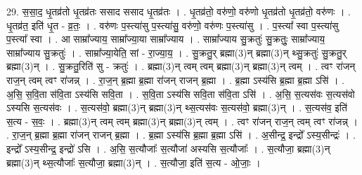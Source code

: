 \documentclass[17pt]{extarticle}
\begin{document}
29. स॒सा॒द॒ धृ॒तव्र॑तो धृ॒तव्र॑तः ससाद ससाद धृ॒तव्र॑तः । . धृ॒तव्र॑तो॒ वरु॑णो॒ वरु॑णो धृ॒तव्र॑तो धृ॒तव्र॑तो॒ वरु॑णः । . धृ॒तव्र॑त॒ इति॑ धृ॒त - व्र॒तः॒ । . वरु॑णः प॒स्त्या॑सु प॒स्त्या॑सु॒ वरु॑णो॒ वरु॑णः प॒स्त्या॑सु । . प॒स्त्या᳚ स्वा प॒स्त्या॑सु प॒स्त्या᳚ स्वा । . आ साम्रा᳚ज्याय॒ साम्रा᳚ज्या॒या साम्रा᳚ज्याय । . साम्रा᳚ज्याय सु॒क्रतुः॑ सु॒क्रतुः॒ साम्रा᳚ज्याय॒ साम्रा᳚ज्याय सु॒क्रतुः॑ । . साम्रा᳚ज्या॒येति॒ सां - रा॒ज्या॒य॒ । . सु॒क्रतु॒र् ब्रह्मा(3)न् ब्रह्मा(3)न् थ्सु॒क्रतुः॑ सु॒क्रतु॒र् ब्रह्मा(3)न् । . सु॒क्रतु॒रिति॑ सु - क्रतुः॑ । . ब्रह्मा(3)न् त्वम् त्वम् ब्रह्मा(3)न् ब्रह्मा(3)न् त्वम् । . त्वꣳ रा॑जन् राज॒न् त्वम् त्वꣳ रा॑जन्न् । . रा॒ज॒न् ब्र॒ह्मा ब्र॒ह्मा रा॑जन् राजन् ब्र॒ह्मा । . ब्र॒ह्मा ऽस्य॑सि ब्र॒ह्मा ब्र॒ह्मा ऽसि॑ । . अ॒सि॒ स॒वि॒ता स॑वि॒ता ऽस्य॑सि सवि॒ता । . स॒वि॒ता ऽस्य॑सि सवि॒ता स॑वि॒ता ऽसि॑ । . अ॒सि॒ स॒त्यस॑वः स॒त्यस॑वो ऽस्यसि स॒त्यस॑वः । . स॒त्यस॑वो॒ ब्रह्मा(3)न् ब्रह्मा(3)न् थ्स॒त्यस॑वः स॒त्यस॑वो॒ ब्रह्मा(3)न् । . स॒त्यस॑व॒ इति॑ स॒त्य - स॒वः॒ । . ब्रह्मा(3)न् त्वम् त्वम् ब्रह्मा(3)न् ब्रह्मा(3)न् त्वम् । . त्वꣳ रा॑जन् राज॒न् त्वम् त्वꣳ रा॑जन्न् । . रा॒ज॒न् ब्र॒ह्मा ब्र॒ह्मा रा॑जन् राजन् ब्र॒ह्मा । . ब्र॒ह्मा ऽस्य॑सि ब्र॒ह्मा ब्र॒ह्मा ऽसि॑ । . अ॒सीन्द्र॒ इन्द्रो᳚ ऽस्य॒सीन्द्रः॑ । . इन्द्रो᳚ ऽस्य॒सीन्द्र॒ इन्द्रो॑ ऽसि । . अ॒सि॒ स॒त्यौजाः᳚ स॒त्यौजा॑ अस्यसि स॒त्यौजाः᳚ । . स॒त्यौजा॒ ब्रह्मा(3)न् ब्रह्मा(3)न् थ्स॒त्यौजाः᳚ स॒त्यौजा॒ ब्रह्मा(3)न् । . स॒त्यौजा॒ इति॑ स॒त्य - ओ॒जाः॒ । \newline
\end{document}
